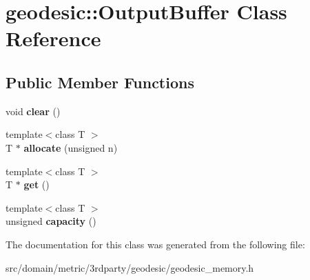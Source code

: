 \hypertarget{classgeodesic_1_1_output_buffer}{}\section{geodesic\+:\+:Output\+Buffer Class Reference}
\label{classgeodesic_1_1_output_buffer}
\subsection*{Public Member Functions}
\begin{DoxyCompactItemize}
\item 
\hypertarget{classgeodesic_1_1_output_buffer_ad3e44f392d1a9a26f9474b7508d39b58}{}void {\bfseries clear} ()\label{classgeodesic_1_1_output_buffer_ad3e44f392d1a9a26f9474b7508d39b58}

\item 
\hypertarget{classgeodesic_1_1_output_buffer_a789926b2e2c44942107610455ff62341}{}{\footnotesize template$<$class T $>$ }\\T $\ast$ {\bfseries allocate} (unsigned n)\label{classgeodesic_1_1_output_buffer_a789926b2e2c44942107610455ff62341}

\item 
\hypertarget{classgeodesic_1_1_output_buffer_ad895277754ee3eaf927f48794100fbc4}{}{\footnotesize template$<$class T $>$ }\\T $\ast$ {\bfseries get} ()\label{classgeodesic_1_1_output_buffer_ad895277754ee3eaf927f48794100fbc4}

\item 
\hypertarget{classgeodesic_1_1_output_buffer_aa8e58bceab56ff5da47485aef7686730}{}{\footnotesize template$<$class T $>$ }\\unsigned {\bfseries capacity} ()\label{classgeodesic_1_1_output_buffer_aa8e58bceab56ff5da47485aef7686730}

\end{DoxyCompactItemize}


The documentation for this class was generated from the following file\+:\begin{DoxyCompactItemize}
\item 
src/domain/metric/3rdparty/geodesic/geodesic\+\_\+memory.\+h\end{DoxyCompactItemize}
